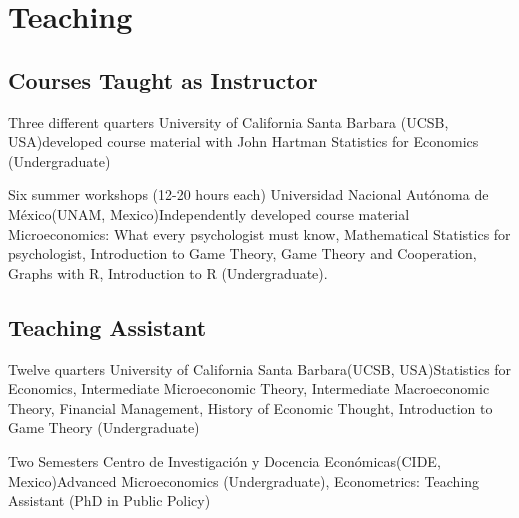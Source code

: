 \section{Teaching}

\subsection{Courses Taught as Instructor}

{Three different quarters}
{University of California Santa Barbara}
{(UCSB, USA)}{developed course material with John Hartman}
{Statistics for Economics (Undergraduate)}

{Six summer workshops (12-20 hours each)}
{Universidad Nacional Autónoma de México}{(UNAM, Mexico)}{Independently developed course material}
{Microeconomics: What every psychologist must know, Mathematical Statistics for psychologist, Introduction to Game Theory, Game Theory and Cooperation, Graphs with R, Introduction to R (Undergraduate).}


\subsection{Teaching Assistant}

{Twelve quarters}
{University of California Santa Barbara}{(UCSB, USA)}{}{Statistics for Economics, Intermediate Microeconomic Theory, Intermediate Macroeconomic Theory, Financial Management, History of Economic Thought, Introduction to Game Theory (Undergraduate)}

{Two Semesters}
{Centro de Investigación y Docencia Económicas}{(CIDE, Mexico)}{}{Advanced Microeconomics (Undergraduate), Econometrics: Teaching Assistant (PhD in Public Policy)}

